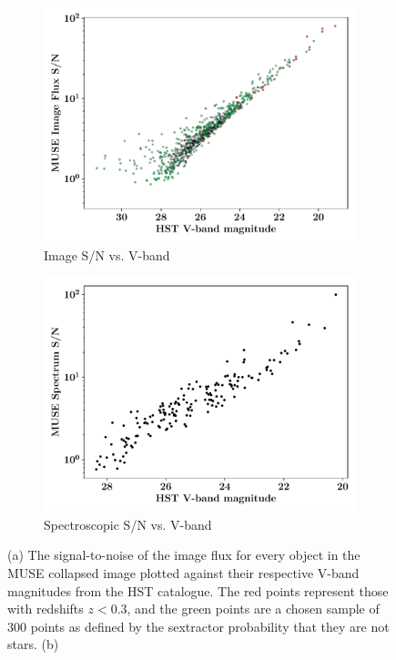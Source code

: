 \documentclass[12pt, twocolumn]{revtex4}    %
\begin{document}
\begin{figure}
  \begin{subfigure}[b]{0.495\textwidth}
    \includegraphics[width=\textwidth]{data/image_sn_vs_vband}
    \captionsetup{justification=justified}
    \caption{Image S/N vs. V-band}
    \label{fig:image_sn_vband}
  \end{subfigure}
  \begin{subfigure}[b]{0.495\textwidth}
    \includegraphics[width=\textwidth]{data/sn_vs_vband}
    \captionsetup{justification=justified}    
    \caption{Spectroscopic S/N vs. V-band}
    \label{fig:spec_sn_vband}
  \end{subfigure}
  \captionsetup{justification=justified}
  \caption[HUDF Objects]{(a) The signal-to-noise of the image flux for every object in the MUSE collapsed image plotted against their respective V-band magnitudes from the HST catalogue. The red points represent those with redshifts $z<0.3$, and the green points are a chosen sample of 300 points as defined by the sextractor probability that they are not stars. (b)}
\end{figure}
\end{document}
